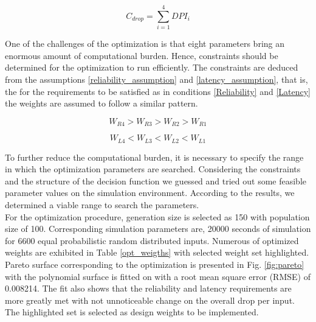 \documentclass[journal,twoside]{IEEEtran}
\begin{document}
\begin{equation} \label{cost_fn_drop}
C_{drop} = \sum_{i=1}^{4} DPI_{i}
\end{equation}

One of the challenges of the optimization is that eight parameters bring an enormous amount of computational burden. Hence, constraints should be determined for the optimization to run efficiently. The constraints are deduced from the assumptions \ref{reliability_assumption} and \ref{latency_assumption}, that is, the for the requirements to be satisfied as in conditions \ref{Reliability} and \ref{Latency} the weights are assumed to follow a similar pattern.

\begin{equation} \label{reliability_assumption}
W_{R4}  >W_{R3}  >W_{R2}  >W_{R1}
\end{equation}

\begin{equation} \label{latency_assumption}
W_{L4}  <W_{L3}  <W_{L2}  <W_{L1}
\end{equation}

To further reduce the computational burden, it is necessary to specify the range in which the optimization parameters are searched. Considering the constraints and the structure of the decision function we guessed and tried out some feasible parameter values on the simulation environment. According to the results, we determined a viable range to search the parameters.\\

\indent For the optimization procedure, generation size is selected as 150 with population size of 100. Corresponding simulation parameters are, 20000 seconds of simulation for 6600 equal probabilistic random distributed inputs. Numerous of optimized weights are exhibited in Table \ref{opt_weigths} with selected weight set highlighted. Pareto surface corresponding to the optimization is presented in Fig. \ref{fig:pareto} with the polynomial surface is fitted on with a root mean square error (RMSE) of 0.008214. The fit also shows that the reliability and latency requirements are more greatly met with not unnoticeable change on the overall drop per input. The highlighted set is selected as design weights to be implemented.
\end{document}

